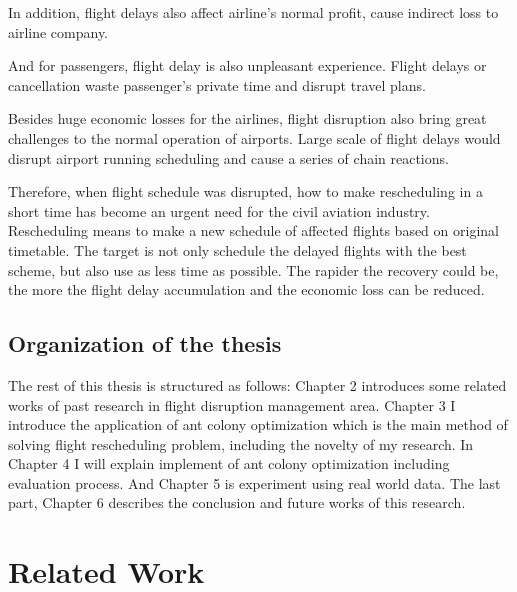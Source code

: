 \documentclass[senior]{IPSstyle}
\begin{document}
In addition, flight delays also affect airline’s normal profit, cause indirect loss to airline company.

And for passengers, flight delay is also unpleasant experience. Flight delays or cancellation waste passenger’s private time and disrupt travel plans.

Besides huge economic losses for the airlines, flight disruption also bring great challenges to the normal operation of airports. Large scale of flight delays would disrupt airport running scheduling and cause a series of chain reactions. 

Therefore, when flight schedule was disrupted, how to make rescheduling in a short time has become an urgent need for the civil aviation industry. Rescheduling means to make a new schedule of affected flights based on original timetable.  The target is not only schedule the delayed flights with the best scheme, but also use as less time as possible. The rapider the recovery could be, the more the flight delay accumulation and the economic loss can be reduced.


\section{Organization of the thesis}
The rest of this thesis is structured as follows: Chapter 2 introduces some related works of past research in flight disruption management area. Chapter 3 I introduce the application of ant colony optimization which is the main method of solving flight rescheduling problem, including the novelty of my research. In Chapter 4 I will explain implement of ant colony optimization including evaluation process. And Chapter 5 is experiment using real world data. The last part, Chapter 6 describes the conclusion and future works of this research.

\chapter{Related Work} \label{related_work}






\end{document}
